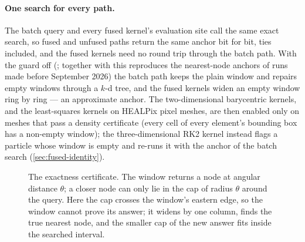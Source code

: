 \paragraph{One search for every path.} The batch query and every fused kernel's evaluation site call
the same exact search, so fused and unfused paths return the same anchor bit for bit, ties included,
and the fused kernels need no round trip through the batch path. With the guard off
(; together with  this reproduces the
nearest-node anchors of runs made before September 2026) the batch path keeps the plain window and
repairs empty windows through a $k$-d tree, and the fused kernels widen an empty window ring by ring ---
an approximate anchor. The two-dimensional barycentric kernels, and the least-squares kernels on HEALPix
pixel meshes, are then enabled only on meshes that pass a density certificate (every cell of every
element's bounding box has a non-empty window); the three-dimensional RK2 kernel instead flags a particle
whose window is empty and re-runs it with the anchor of the batch search (\cref{sec:fused-identity}).

\begin{figure}[t]
\centering
{}
\caption{The exactness certificate. The window returns a node at angular distance $\theta$; a closer
node can only lie in the cap of radius $\theta$ around the query. Here the cap crosses the window's
eastern edge, so the window cannot prove its answer; it widens by one column, finds the true nearest
node, and the smaller cap of the new answer fits inside the searched interval.}
\label{fig:loc-certificate}
\end{figure}

